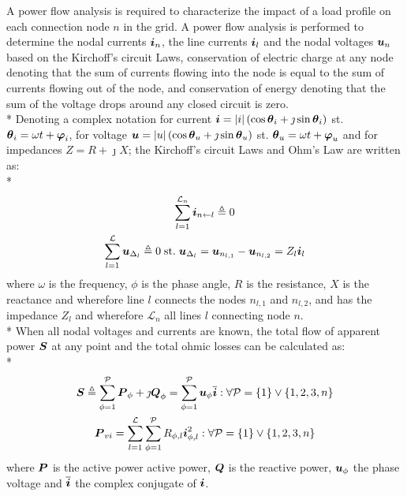 A power flow analysis is required to characterize the impact of a load profile on each connection node $n$ in the grid. A power flow analysis is performed to determine the nodal currents $\boldsymbol{i}_{n}$, the line currents $\boldsymbol{i}_{l}$ and the nodal voltages $\boldsymbol{u}_{n}$ based on the Kirchoff's circuit Laws, \ie conservation of electric charge at any node denoting that the sum of currents flowing into the node is equal to the sum of currents flowing out of the node, and conservation of energy denoting that the sum of the voltage drops around any closed circuit is zero. \\*
Denoting a complex notation for current $\boldsymbol{i} = \vert i \vert \left( \cos \boldsymbol{\theta}_{i} + \jmath \sin \boldsymbol{\theta}_{i} \right)$ st. $\boldsymbol{\theta}_{i} = \omega t + \boldsymbol{\varphi}_{i}$, for voltage $\boldsymbol{u} = \vert u \vert \left( \cos \boldsymbol{\theta}_{u} + \jmath \sin \boldsymbol{\theta}_{u} \right)$ st. $\boldsymbol{\theta}_{u} = \omega t + \boldsymbol{\varphi}_{u}$ and for impedances $Z = R + \jmath X$; the Kirchoff's circuit Laws and Ohm's Law are written as: \\*
%
\begin{gather}
\sum_{l=1}^{\mathcal{L}_{n}} \boldsymbol{i}_{n \leftarrow l} \triangleq 0 \label{kirch1} \\
\sum_{l=1}^{\mathcal{L}} \boldsymbol{u}_{\Delta_{l}} \triangleq 0 \; \mbox{st.} \; \boldsymbol{u}_{\Delta_{l}} = \boldsymbol{u}_{n_{l,1}} - \boldsymbol{u}_{n_{l,2}} = Z_{l} \boldsymbol{i}_{l}  \label{kirch2}
\end{gather}
where $\omega$ is the frequency, $\phi$ is the phase angle, $R$ is the resistance, $X$ is the reactance and wherefore line $l$ connects the nodes $n_{l,1}$ and $n_{l,2}$, and has the impedance $Z_{l}$ and wherefore $\mathcal{L}_{n}$ all lines $l$ connecting node $n$. \\*
%
When all nodal voltages and currents are known, the total flow of apparent power $\boldsymbol{S}$ at any point and the total ohmic losses can be calculated as: \\*
\begin{gather}
\boldsymbol{S} \triangleq \sum_{\phi=1}^{\mathcal{P}} \boldsymbol{P}_{\phi} + \jmath \boldsymbol{Q}_{\phi} = \sum_{\phi=1}^{\mathcal{P}} \boldsymbol{u}_{\phi} \overline{\boldsymbol{i}} : \forall \mathcal{P} = \{1\} \vee \{1,2,3,n\} \\
\boldsymbol{P}_{vi} = \sum_{l=1}^{\mathcal{L}} \sum_{\phi=1}^{\mathcal{P}} R_{\phi,l} \boldsymbol{i}_{\phi,l}^{2} : \forall \mathcal{P} = \{1\} \vee \{1,2,3,n\} \label{Ploss}
\end{gather}
where $\boldsymbol{P}$ is the active power active power, $\boldsymbol{Q}$ is the reactive power, $\boldsymbol{u}_{\phi}$ the phase voltage and $\overline{\boldsymbol{i}}$ the complex conjugate of $\boldsymbol{i}$.

